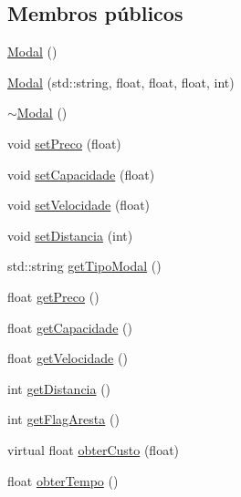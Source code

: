 \subsection*{Membros públicos}
\begin{DoxyCompactItemize}
\item 
\hyperlink{classModal_a8762a8d9f09cb6a2ec5f54f5d26412c0}{Modal} ()
\item 
\hyperlink{classModal_a17560766811007d0af99fd6099325d52}{Modal} (std\+::string, float, float, float, int)
\item 
\hyperlink{classModal_a4a2e7830211c07075078b5d5186dab54}{$\sim$\+Modal} ()
\item 
void \hyperlink{classModal_ade6a106d1c7a0bc095ea1a012891ed00}{set\+Preco} (float)
\item 
void \hyperlink{classModal_affd03b3938af5cbe3541f82ae5ad8b6a}{set\+Capacidade} (float)
\item 
void \hyperlink{classModal_ac8da271cfb67468b89cbca0b3951b9f7}{set\+Velocidade} (float)
\item 
void \hyperlink{classModal_adae73e94a5d76a2a97329cba1fe7fb20}{set\+Distancia} (int)
\item 
std\+::string \hyperlink{classModal_ad0e185312cd36ad83b4e19fd1cd532be}{get\+Tipo\+Modal} ()
\item 
float \hyperlink{classModal_ae124094018f5e049d5137a8eec893a79}{get\+Preco} ()
\item 
float \hyperlink{classModal_ac9750361d92b6ad91674851852c7362f}{get\+Capacidade} ()
\item 
float \hyperlink{classModal_acac9a4b13c4596842253e25f84872b32}{get\+Velocidade} ()
\item 
int \hyperlink{classModal_a1eedb4dfdddd81a5a7c7b3203e50e68c}{get\+Distancia} ()
\item 
int \hyperlink{classModal_a6fcee61fe1de7099605ff95707edaaa4}{get\+Flag\+Aresta} ()
\item 
virtual float \hyperlink{classModal_a20cee7247cce33806d681e1d60347cc5}{obter\+Custo} (float)
\item 
float \hyperlink{classModal_a71e2bda54694608c149ae0d72b3693a4}{obter\+Tempo} ()
\end{DoxyCompactItemize}
